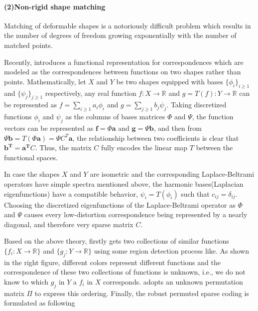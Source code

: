 \paragraph{(2)Non-rigid shape matching}
Matching of deformable shapes is a notoriously difficult problem which results in the number of degrees of freedom growing exponentially with the number of matched points.

Recently, \cite{ovsjanikov2012functional} introduces a functional representation for correspondences 
which are modeled as the correspondences between functions on two shapes rather than points.
Mathematically, let $X$ and $Y$ be two shapes equipped with bases $\{\phi_{i}\}_{i\ge1}$ and $\{\psi_{j}\}_{j\ge1}$ respectively,
any real function $f: X\to \mathbb{R}$ and $g=T(f): Y\to \mathbb{R}$ can be represented as $f=\sum_{i\ge1}^{}a_{i}\phi_{i}$ and $g=\sum_{j\ge1}^{}b_{j}\psi_{j}$.
Taking discretized functions $\phi_{i}$ and $\psi_{j}$ as the columns of bases matrices $\Phi$ and $\Psi$,
the function vectors can be represented as
$\mathbf{f}=\Phi \mathbf{a}$ and
$\mathbf{g}=\Psi \mathbf{b}$, and then from
$\Psi \mathbf{b}=T(\Phi \mathbf{a})=\Psi C^{T}\mathbf{a}$,
the relationship between two coefficients is clear that $\mathbf{b^{T}}=\mathbf{a^{T}}C$.
Thus, the matrix $C$ fully encodes the linear map $T$ between the functional spaces.


In case the shapes $X$ and $Y$ are isometric and the corresponding Laplace-Beltrami operators have simple spectra mentioned above,
the harmonic bases(Laplacian eigenfunctions) have a compatible behavior, $\psi_{i}=T(\phi_{i})$ such that $c_{ij}=\delta_{ij}$.
Choosing the discretized eigenfunctions of the Laplace-Beltrami operator as $\Phi$ and $\Psi$ causes every low-distortion correspondence being represented by a nearly diagonal, and therefore very sparse matrix $C$.

Based on the above theory, \cite{pokrass2013sparse} firstly gets two collections of similar functions $\{f_{i}:X\to \mathbb{R}\}$ and $\{g_{j}:Y\to \mathbb{R}\}$ using some region detection process like\cite{litman2011diffusion}. 
As shown in the right figure, different colors represent different functions and the correspondence of these two collections of functions is unknown, i.e., we do not know to which $g_{j}$ in $Y$ a $f_{i}$ in $X$ corresponds.
\cite{pokrass2013sparse} adopts an unknown permutation matrix $\Pi$ to express this ordering. Finally, the robust permuted sparse coding is formulated as following

